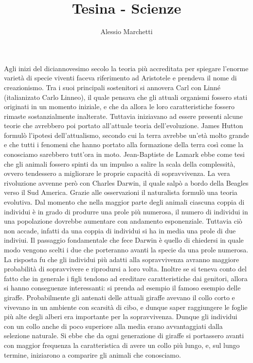\documentclass[a4paper, 11pt]{article}
\title{\myfont Tesina - Scienze}
\author{Alessio Marchetti}
\date{}
\begin{document}
\maketitle

Agli inizi del diciannovesimo secolo la teoria pi\`u accreditata per spiegare
l'enorme variet\`a di specie viventi faceva riferimento ad Aristotele e prendeva
il nome di creazionismo. Tra i suoi principali sostenitori si annovera Carl con
Linn\'e (italianizato Carlo Linneo), il quale pensava che gli attuali organismi
fossero stati originati in un momento iniziale, e che da allora le loro
caratteristiche fossero rimaste sostanzialmente inalterate. Tuttavia iniziavano
ad essere presenti alcune teorie che avrebbero poi portato all'attuale teoria
dell'evoluzione. James Hutton formul\`o l'ipotesi dell'attualismo, secondo cui
la terra avrebbe un'et\`a molto grande e che tutti i fenomeni che hanno portato
alla formazione della terra cos\`i come la conosciamo sarebbero tutt'ora in
moto. Jean-Baptiste de Lamark ebbe come tesi che gli animali fossero spinti da
un impulso a salire la scala della complessit\`a, ovvero tendessero a migliorare
le proprie capacit\`a di sopravvivenza. La vera rivoluzione avvenne per\`o con
Charles Darwin, il quale salp\`o a bordo della Beagles verso il Sud America.
Grazie alle osservazioni il naturalista formul\`o una teoria evolutiva. Dal
momento che nella maggior parte degli animali ciascuna coppia di individui \`e
in grado di produrre una prole pi\`u numerosa, il numero di individui in una
popolazione dovrebbe aumentare con andamento esponenziale. Tuttavia ci\`o non
accade, infatti da una coppia  di individui si ha in media una prole di due
indiviui. Il passaggio fondamentale che fece Darwin \`e quello di chiedersi in
quale modo vengono scelti i due che porteranno avanti la specie da una prole
numerosa. La risposta fu che gli individui pi\`u adatti alla sopravvivenza
avranno maggiore probabilit\`a di sopravvivere e riprodursi a loro volta.
Inoltre se si teneva conto del fatto che in generale i figli tendono ad
ereditare caratteristiche dai genitori, allora si hanno conseguenze
interessanti: si prenda ad esempio il famoso esempio delle giraffe.
Probabilmente gli antenati delle attuali giraffe avevano il collo corto e
vivevano in un ambiente con scarsit\`a di cibo, e dunque saper raggiungere le
foglie pi\`u alte degli alberi era importante per la sopravvivenza. Dunque gli
individui con un collo anche di poco superiore alla media erano avvantaggiati
dalla selezione naturale. Si ebbe che da ogni generazione di giraffe si
portassero avanti con maggior frequenza la caratteristica di avere un collo
pi\`u lungo, e, sul lungo termine, iniziarono a comparire gli animali che
conosciamo. 
\end{document}
